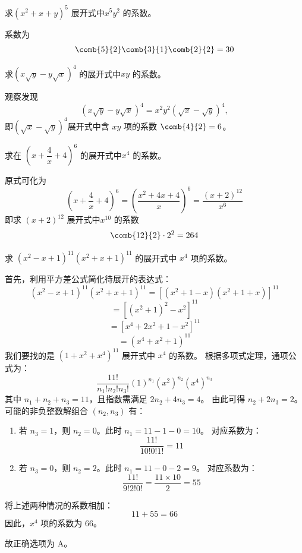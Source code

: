 \begin{questions}
    \question 求\((x^2 + x + y)^5\) 展开式中\( x^5 y^2 \) 的系数。  
    \begin{solution}
        系数为
        \[
        \comb{5}{2}\comb{3}{1}\comb{2}{2}=30
        \]
    \end{solution}

    \question 求\(\left(x \sqrt{y} - y \sqrt{x}\right)^4\) 的展开式中\( xy \) 的系数。
    \begin{solution}
        观察发现
        \[
        (x\sqrt{y}-y\sqrt{x})^4 = x^2y^2(\sqrt{x}-\sqrt{y})^4,
        \]
        即$(\sqrt{x}-\sqrt{y})^4$展开式中含 $xy$ 项的系数 $\comb{4}{2}=6$。
    \end{solution}

    \question 求在 $\left(x+\dfrac{4}{x}+4\right)^6$ 的展开式中$x^4$ 的系数。
    \begin{solution}
        原式可化为
        \[
        \left(x + \dfrac{4}{x} + 4\right)^6 = \left(\dfrac{x^2 + 4x + 4}{x}\right)^6 = \dfrac{(x+2)^{12}}{x^6}
        \]
        即求 $(x+2)^{12}$ 展开式中$x^{10}$ 的系数
        \[
        \comb{12}{2} \cdot 2^2 = 264
        \]
    \end{solution}

    \question 求 $(x^2 - x + 1)^{11}(x^2 + x + 1)^{11}$ 的展开式中 $x^4$ 项的系数。

\begin{solution}
首先，利用平方差公式简化待展开的表达式：
\[
(x^2 - x + 1)^{11}(x^2 + x + 1)^{11} = [(x^2 + 1 - x)(x^2 + 1 + x)]^{11}
\]
\[
= [(x^2 + 1)^2 - x^2]^{11}
\]
\[
= [x^4 + 2x^2 + 1 - x^2]^{11}
\]
\[
= (x^4 + x^2 + 1)^{11}
\]
我们要找的是 $(1 + x^2 + x^4)^{11}$ 展开式中 $x^4$ 的系数。
根据多项式定理，通项公式为：
\[
\frac{11!}{n_1! n_2! n_3!} (1)^{n_1} (x^2)^{n_2} (x^4)^{n_3}
\]
其中 $n_1 + n_2 + n_3 = 11$，且指数需满足 $2n_2 + 4n_3 = 4$。
由此可得 $n_2 + 2n_3 = 2$。可能的非负整数解组合 $(n_2, n_3)$ 有：
\begin{enumerate}
    \item 若 $n_3 = 1$，则 $n_2 = 0$。此时 $n_1 = 11 - 1 - 0 = 10$。
    对应系数为：
    \[
    \frac{11!}{10! 0! 1!} = 11
    \]
    \item 若 $n_3 = 0$，则 $n_2 = 2$。此时 $n_1 = 11 - 0 - 2 = 9$。
    对应系数为：
    \[
    \frac{11!}{9! 2! 0!} = \frac{11 \times 10}{2} = 55
    \]
\end{enumerate}
将上述两种情况的系数相加：
\[
11 + 55 = 66
\]
因此，$x^4$ 项的系数为 $66$。

故正确选项为 A。
\end{solution}


\end{questions}
